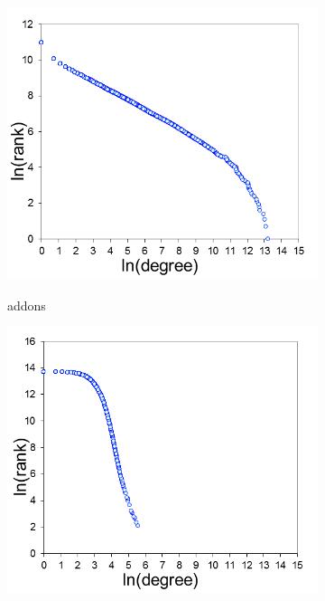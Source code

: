 \documentclass[ijoc,nonblindrev]{informs3} %
\numberwithin{equation}{subsection}
\begin{document}
\begin{figure}[t]
\centering
\begin{subfigure}[b]{0.30\textwidth}
	\centering
\includegraphics[scale=0.30]{figures/zipf_addon1.png} \\
\caption{addons} 
\label{fig:power_law_addons}
\end{subfigure}
\begin{subfigure}[b]{0.30\textwidth}
	\centering
\includegraphics[scale=0.30]{figures/zipf-users1.png} \\

\end{subfigure}
\end{figure}
\end{document}
